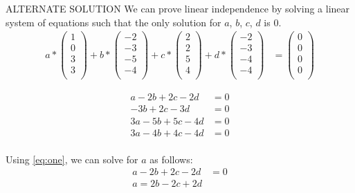 \documentclass[12pt]{article}
\begin{document}
\begin{itemize}
\newline ALTERNATE SOLUTION
\newline 
We can prove linear independence by solving a linear system of equations such that the only solution for $a$, $b$, $c$, $d$ is 0. \\
\begin{align*}
    a * \begin{pmatrix}
    1 \\
    0 \\
    3 \\
    3 \\
    \end{pmatrix} + b * \begin{pmatrix}
    -2 \\
    -3 \\
    -5 \\
    -4 \\
    \end{pmatrix} + c * \begin{pmatrix}
    2 \\
    2 \\
    5 \\
    4 \\
    \end{pmatrix} + d * \begin{pmatrix}
    -2 \\
    -3 \\
    -4 \\
    -4 \\
    \end{pmatrix} &= \begin{pmatrix}
    0 \\
    0 \\
    0 \\
    0 \\
    \end{pmatrix}
\end{align*}

\begin{align*}
    a - 2b + 2c - 2d &= 0 \label{eq:one} \tag{1} \\
    -3b + 2c - 3d &= 0 \label{eq:two} \tag{2}\\
    3a - 5b + 5c - 4d &= 0 \label{eq:three} \tag{3} \\
    3a - 4b + 4c - 4d &= 0 \label{eq:four} \tag{4} \\
\end{align*}

Using \eqref{eq:one}, we can solve for $a$ as follows:
\begin{align*}
    a - 2b + 2c - 2d &= 0 \\
    a = 2b - 2c + 2d \\
\end{align*}


\end{itemize}
\end{document}

